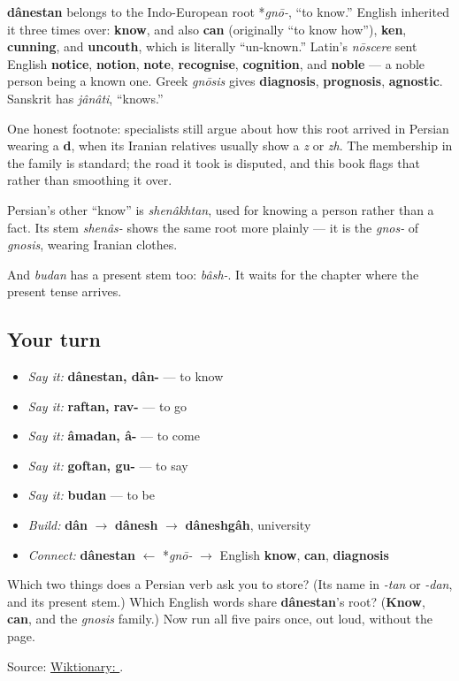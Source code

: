 \begin{cousinweb}
\textbf{dânestan} belongs to the Indo-European root *\emph{gnō-}, “to know.” English inherited it three times over: \textbf{know}, and also \textbf{can} (originally “to know how”), \textbf{ken}, \textbf{cunning}, and \textbf{uncouth}, which is literally “un-known.” Latin's \emph{nōscere} sent English \textbf{notice}, \textbf{notion}, \textbf{note}, \textbf{recognise}, \textbf{cognition}, and \textbf{noble} — a noble person being a known one. Greek \emph{gnōsis} gives \textbf{diagnosis}, \textbf{prognosis}, \textbf{agnostic}. Sanskrit has \emph{jânâti}, “knows.”

One honest footnote: specialists still argue about how this root arrived in Persian wearing a \textbf{d}, when its Iranian relatives usually show a \emph{z} or \emph{zh}. The membership in the family is standard; the road it took is disputed, and this book flags that rather than smoothing it over.

Persian's other “know” is \emph{shenâkhtan}, used for knowing a person rather than a fact. Its stem \emph{shenâs-} shows the same root more plainly — it is the \emph{gnos-} of \emph{gnosis}, wearing Iranian clothes.

And \emph{budan} has a present stem too: \emph{bâsh-}. It waits for the chapter where the present tense arrives.
\end{cousinweb}

\subsection*{Your turn}
\begin{itemize}
\raggedright
  \item \emph{Say it:} \textbf{dânestan, dân-} — to know
  \item \emph{Say it:} \textbf{raftan, rav-} — to go
  \item \emph{Say it:} \textbf{âmadan, â-} — to come
  \item \emph{Say it:} \textbf{goftan, gu-} — to say
  \item \emph{Say it:} \textbf{budan} — to be
  \item \emph{Build:} \textbf{dân} $\to$ \textbf{dânesh} $\to$ \textbf{dâneshgâh}, university
  \item \emph{Connect:} \textbf{dânestan} $\leftarrow$ *\emph{gnō-} $\to$ English \textbf{know}, \textbf{can}, \textbf{diagnosis}
\end{itemize}

\begin{tcolorbox}[breakable,colback=teal!4,colframe=teal!35!black,title={Before you move on}]
Which two things does a Persian verb ask you to store? (Its name in \emph{-tan} or \emph{-dan}, and its present stem.) Which English words share \textbf{dânestan}'s root? (\textbf{Know}, \textbf{can}, and the \emph{gnosis} family.) Now run all five pairs once, out loud, without the page.

Source: \href{https://en.wiktionary.org/wiki/\%D8\%AF\%D8\%A7\%D9\%86\%D8\%B3\%D8\%AA\%D9\%86}{Wiktionary: }.
\end{tcolorbox}

